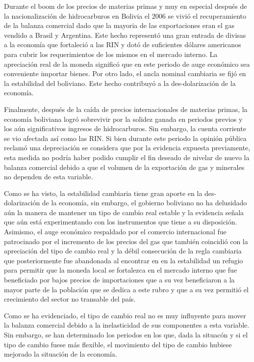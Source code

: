 \documentclass[12pt,letterpaper]{article}
\begin{document}
Durante el boom de los precios de materias primas y muy en especial después de la nacionalización de hidrocarburos en Bolivia el 2006 se vivió el recuperamiento de la balanza comercial dado que la mayoria de las exportaciones eran el gas vendido a Brasil y Argentina. Este hecho representó una gran entrada de divisas a la economía que fortaleció a las RIN y dotó de suficientes dólares americanos para cubrir los requerimientos de los mismos en el mercado interno. La apreciación real de la moneda significó que en este periodo de auge económico sea conveniente importar bienes. Por otro lado, el ancla nominal cambiaria se fijó en la estabilidad del boliviano. Este hecho contribuyó a la des-dolarización de la economía.

Finalmente, después de la caída de precios internacionales de materias primas, la economía boliviana logró sobrevivir por la solidez ganada en periodos previos y los aún significativos ingresos de hidrocarburos. Sin embargo, la cuenta corriente se vio afectada así como las RIN. Si bien durante este periodo la opinión pública reclamó una depreciación se considera que por la evidencia expuesta previamente, esta medida no podría haber podido cumplir el fin deseado de nivelar de nuevo la balanza comercial debido a que el volumen de la exportación de gas y minerales no dependen de esta variable.

Como se ha visto, la estabilidad cambiaria tiene gran aporte en la des-dolarización de la economía, sin embargo, el gobierno boliviano no ha delusidado aún la manera de mantener un tipo de cambio real estable y la evidencia señala que aún está experimentando con los instrumentos que tiene a su disposición. Asimismo, el auge económico respaldado por el comercio internacional fue patrocinado por el incremento de los precios del gas que también coincidió con la apreciación del tipo de cambio real y la débil consecución de la regla cambiaria que posteriormente fue abandonada al encontrar en en la estabilidad un refugio para permitir que la moneda local se fortalezca en el mercado interno que fue beneficiado por bajos precios de importaciones que a su vez beneficiaron a la mayor parte de la población que se dedica a este rubro y que a su vez permitió el crecimiento del sector no transable del país.


Como se ha evidenciado, el tipo de cambio real no es muy influyente para mover la balanza comercial debido a la inelasticidad de sus componentes a esta variable. Sin embargo, se han determinado los periodos en los que, dada la situacón y si el tipo de cambio fuese más flexible, el movimiento del tipo de cambio hubiese mejorado la situación de la economía.
\end{document}
